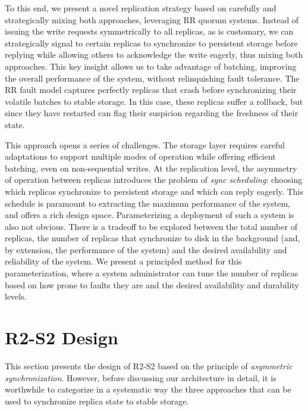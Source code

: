 To this end, we present a novel replication strategy based on
carefully and strategically mixing both approaches, leveraging
\ac{RR} quorum systems. Instead of issuing the write
requests symmetrically to all replicas, as is customary, we can
strategically signal to certain replicas to synchronize to
persistent storage before replying while allowing others to
acknowledge the write eagerly, thus mixing both approaches. This
key insight allows us to take advantage of batching, improving the overall
performance of the system, without relinquishing fault tolerance.
The \ac{RR} fault model captures perfectly replicas that
crash before synchronizing their volatile batches to stable
storage. In this case, these replicas suffer a rollback, but
since they have restarted can flag their suspicion regarding the
freshness of their state.

This approach opens a series of challenges. The storage layer
requires careful adaptations to support multiple modes of
operation while offering efficient batching, even on
non-sequential writes. At the replication level, the asymmetry of
operation between replicas introduces the problem of \emph{sync
scheduling}: choosing which replicas synchronize to persistent storage
and which can reply eagerly. This schedule is paramount to
extracting the maximum performance of the system, and offers a
rich design space. Parameterizing a deployment of such a system is
also not obvious. There is a tradeoff to be explored between the
total number of replicas, the number of replicas that synchronize
to disk in the background (and, by extension, the performance of
the system) and the desired availability and reliability of the
system. We present a principled method for this parameterization,
where a system administrator can tune the number of replicas
based on how prone to faults they are and the desired
availability and durability levels.

\section{\ac{R2-S2} Design}\label{sec:r2s2design}

This section presents the design of \ac{R2-S2}
based on the principle of \emph{asymmetric synchronization}. However,
before discussing our architecture in detail, it is worthwhile to
categorize in a systematic way the three approaches that can be used to synchronize
replica state to stable storage.

